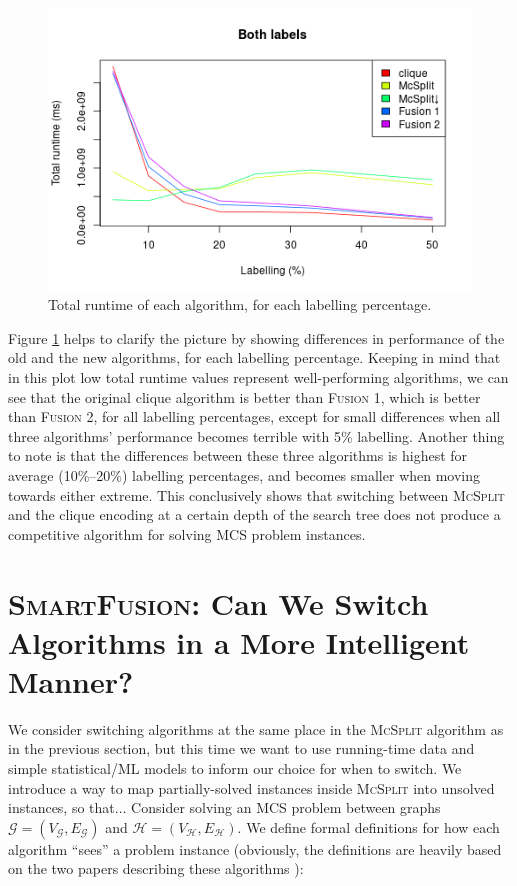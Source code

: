 \documentclass{l4proj}
\theoremstyle{definition}
\theoremstyle{remark}
\begin{document}
\begin{figure}
  \centering
  \includegraphics[scale=0.5]{images/fusion_linechart.png}
  \caption{Total runtime of each algorithm, for each labelling percentage.}
  \label{fig:fusion_lines}
\end{figure}

Figure \ref{fig:fusion_lines} helps to clarify the picture by showing
differences in performance of the old and the new algorithms, for each labelling
percentage. Keeping in mind that in this plot low total runtime values represent
well-performing algorithms, we can see that the original clique algorithm is
better than \textsc{Fusion 1}, which is better than \textsc{Fusion 2}, for all
labelling percentages, except for small differences when all three algorithms'
performance becomes terrible with 5\% labelling. Another thing to note is that
the differences between these three algorithms is highest for average
(10\%--20\%) labelling percentages, and becomes smaller when moving towards
either extreme. This conclusively shows that switching between \textsc{McSplit}
and the clique encoding at a certain depth of the search tree does not produce a
competitive algorithm for solving MCS problem instances.

\section{\textsc{SmartFusion}: Can We Switch Algorithms in a More Intelligent
  Manner?}

We consider switching algorithms at the same place in the \textsc{McSplit}
algorithm as in the previous section, but this time we want to use running-time
data and simple statistical/ML models to inform our choice for when to switch.
We introduce a way to map partially-solved instances inside \textsc{McSplit}
into unsolved instances, so that... Consider solving an MCS problem between
graphs $\mathcal{G} = (V_{\mathcal{G}}, E_{\mathcal{G}})$ and $\mathcal{H} =
(V_{\mathcal{H}}, E_{\mathcal{H}})$. We define formal definitions for how each
algorithm ``sees'' a problem instance (obviously, the definitions are heavily
based on the two papers describing these algorithms
\cite{DBLP:conf/cp/McCreeshNPS16, DBLP:conf/ijcai/McCreeshPT17}):
\end{document}
